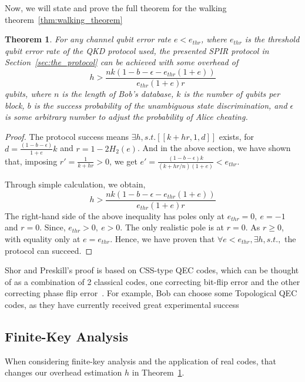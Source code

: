 \documentclass[%
 reprint,
superscriptaddress,
 amsmath,amssymb,
 aps,
]{revtex4-2}
\newtheorem{theorem}{Theorem}[section]
\begin{document}
Now, we will state and prove the full theorem for the walking theorem~\ref{thm:walking_theorem}

\begin{theorem}
    For any channel qubit error rate $e<e_{thr}$, where $e_{thr}$ is the threshold qubit error rate of the QKD protocol used, the presented SPIR protocol in Section~\ref{sec:the_protocol} can be achieved with some overhead of
    \begin{equation}
        h >\frac{nk(1-b-\epsilon-e_{thr}(1+e))}{e_{thr}(1+e)r}
    \end{equation} qubits, where $n$ is the length of Bob's database, $k$ is the number of qubits per block, $b$ is the success probability of the unambiguous state discrimination, and $\epsilon$ is some arbitrary number to adjust the probability of Alice cheating.
\label{thm:success_protocol}
\end{theorem}

\begin{proof}
    The protocol success means $\exists h, s.t. [[k+hr, 1, d]]$ exists, for $d=\frac{(1-b-\epsilon)}{1+e}k$ and $r=1-2H_2(e)$. And in the above section, we have shown that, imposing $r'=\frac{1}{k+hr}>0$, we get $e'=\frac{(1-b-\epsilon)k}{(k+hr/n)(1+e)}<e_{thr}$.

    Through simple calculation, we obtain,
    \begin{equation}
         h>\frac{nk(1-b-\epsilon-e_{thr}(1+e))}{e_{thr}(1+e)r}
    \end{equation}
    The right-hand side of the above inequality has poles only at $e_{thr}=0,\ e=-1$ and $r=0$. Since, $e_{thr}>0,\ e>0$. The only realistic pole is at $r=0$. As $r\ge0$, with equality only at $e=e_{thr}$. Hence, we have proven that $\forall e<e_{thr}, \exists h, s.t.,$ the protocol can succeed.
\end{proof}

Shor and Preskill's proof is based on CSS-type QEC codes, which can be thought of as a combination of 2 classical codes, one correcting bit-flip error and the other correcting phase flip error~\cite{CSS_Shor_Calderbank, CSS_Steane, Shors_9_qubits_code}. For example, Bob can choose some Topological QEC codes, as they have currently received great experimental success~\cite{Surfacecode1, google_surface_code, TQEC1}

\subsection{Finite-Key Analysis}
When considering finite-key analysis and the application of real codes, that changes our overhead estimation $h$ in Theorem~\ref{thm:success_protocol}.
\end{document}
